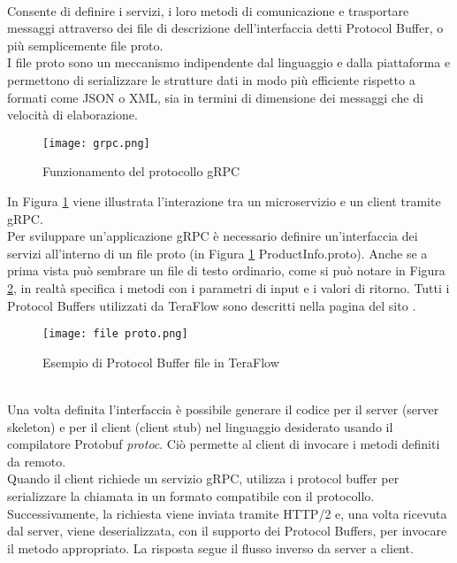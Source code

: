 \\Consente di definire i servizi, i loro metodi di comunicazione e trasportare messaggi attraverso dei file di descrizione dell'interfaccia detti Protocol Buffer, o più semplicemente file proto.
\\I file proto sono un meccanismo indipendente dal linguaggio e dalla piattaforma 
e permettono di serializzare le strutture dati in modo più efficiente rispetto a formati come JSON o XML, sia in termini di dimensione dei messaggi che di velocità di elaborazione.
\begin{figure}[h]
    \centering
   \texttt{[image: grpc.png]}
    \caption{Funzionamento del protocollo gRPC \cite{librogrpc}}
    \label{fig:grpc}
\end{figure}
In Figura \ref{fig:grpc} viene illustrata l'interazione tra un microservizio e un client tramite gRPC.
\\Per sviluppare un'applicazione gRPC è necessario definire un'interfaccia dei servizi %
all'interno di un file proto (in Figura \ref{fig:grpc} ProductInfo.proto).
Anche se a prima vista può sembrare un file di testo ordinario, come si può notare in Figura \ref{fig:proto}, in realtà specifica i metodi con i parametri di input e i valori di ritorno.
Tutti i Protocol Buffers utilizzati da TeraFlow sono descritti nella pagina del sito \cite{ProtoBuf}.
\begin{figure}[h]
    \centering
   \texttt{[image: file proto.png]}
    \caption{Esempio di Protocol Buffer file in TeraFlow \cite{ProtoBuf}}
    \label{fig:proto}
\end{figure}
\\Una volta definita l'interfaccia è possibile generare il codice per il server (server skeleton) e per il client (client stub) nel linguaggio desiderato usando il compilatore Protobuf \textit{protoc}\cite{librogrpc}.
Ciò permette al client di invocare i metodi definiti da remoto.
\\Quando il client richiede un servizio gRPC, utilizza i protocol buffer per serializzare la chiamata in un formato compatibile con il protocollo. 
Successivamente, la richiesta viene inviata tramite HTTP/2 e, una volta ricevuta dal server, viene deserializzata, con il supporto dei Protocol Buffers, per invocare il metodo appropriato.
La risposta segue il flusso inverso da server a client\cite{librogrpc}.
